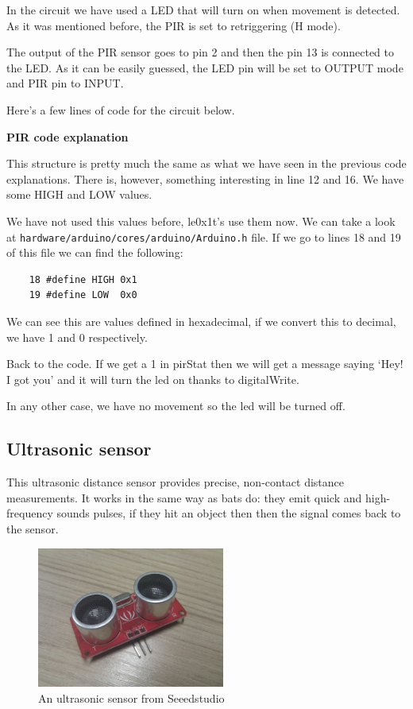 In the circuit we have used a LED that will turn on when movement is detected. As it was mentioned before, the PIR is set to retriggering (H mode).

The output of the PIR sensor goes to pin 2 and then the pin 13 is connected to the LED. As it can be easily guessed, the LED pin will be set to OUTPUT mode and PIR pin to INPUT.

Here's a few lines of code for the circuit below.



\vspace{5mm}
\textbf{PIR code explanation}

This structure is pretty much the same as what we have seen in the previous code explanations. There is, however, something interesting in line 12 and 16. We have some HIGH and LOW values.

We have not used this values before, le0x1t's use them now. We can take a look at \verb|hardware/arduino/cores/arduino/Arduino.h| file. If we go to lines 18 and 19 of this file we can find the following:
\begin{verbatim}
    18 #define HIGH 0x1
    19 #define LOW  0x0
\end{verbatim}
We can see this are values defined in hexadecimal, if we convert this to decimal, we have 1 and 0 respectively.

Back to the code. If we get a 1 in pirStat then we will get a message saying `Hey! I got you' and it will turn the led on thanks to digitalWrite.

In any other case, we have no movement so the led will be turned off.

\subsection{Ultrasonic sensor}
This ultrasonic distance sensor provides precise, non-contact distance measurements. It works in the same way as bats do: they emit quick and high-frequency sounds pulses, if they hit an object then then the signal comes back to the sensor.

\begin{figure}[H]
    \centering
    \includegraphics[width=0.55\textwidth]{fig/ultrasonic.jpg}
    \caption{An ultrasonic sensor from Seeedstudio}
    \label{fig:ultrasonic}
\end{figure}

